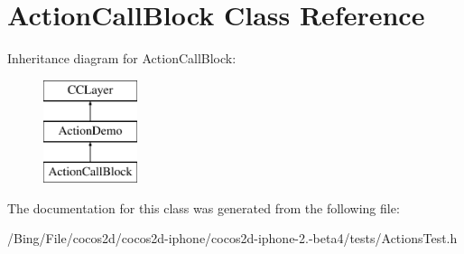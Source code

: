 \hypertarget{interface_action_call_block}{\section{Action\-Call\-Block Class Reference}
\label{interface_action_call_block}
}
Inheritance diagram for Action\-Call\-Block\-:\begin{figure}[H]
\begin{center}
\leavevmode
\includegraphics[height=3.000000cm]{interface_action_call_block}
\end{center}
\end{figure}


The documentation for this class was generated from the following file\-:\begin{DoxyCompactItemize}
\item 
/\-Bing/\-File/cocos2d/cocos2d-\/iphone/cocos2d-\/iphone-\/2.-\/beta4/tests/Actions\-Test.\-h\end{DoxyCompactItemize}

